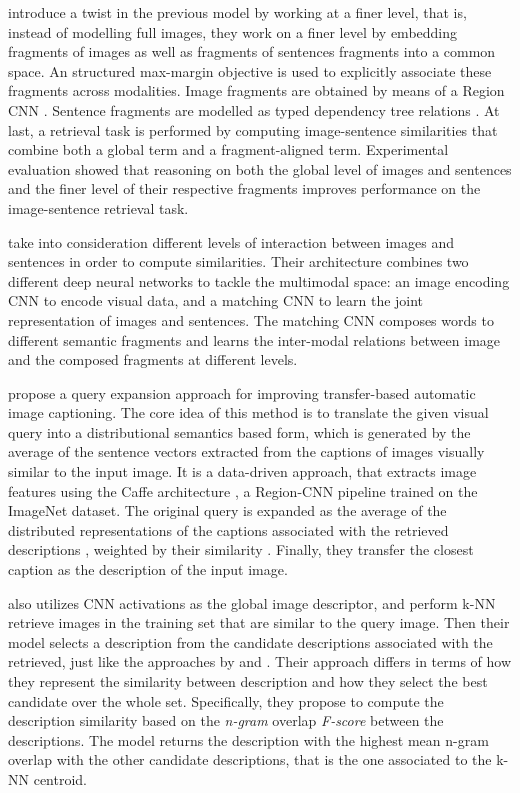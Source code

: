 \citet{Karpathy2014} introduce a twist in the previous model by working at a finer level, that is, instead of modelling full images, they work on a finer level by embedding fragments of images as well as fragments of sentences fragments into a common space.  An structured max-margin objective is used to explicitly associate these fragments across modalities. Image fragments are obtained by means of a Region CNN \citep{Girshick2014}. Sentence fragments are modelled as typed dependency tree relations \citep{DeMarneffe2006}. At last, a retrieval task is performed by computing image-sentence similarities that combine both a global term and a fragment-aligned term. Experimental evaluation showed that reasoning on both the global level of images and sentences and the finer level of their respective fragments improves performance on the image-sentence retrieval task.

\citet{Ma2015} take into consideration different levels of interaction between images and sentences in order to compute similarities. Their architecture combines two different deep neural networks to tackle the multimodal space: an image encoding CNN \citep{Simonyan2015} to encode visual data, and a matching CNN \citep{Hu2014} to learn the joint representation of images and sentences. The matching CNN composes words to different semantic fragments and learns the inter-modal relations between image and the composed fragments at different levels. 

\citet{Yagcioglu2015} propose a query expansion approach for improving transfer-based automatic image captioning. The core idea of this method is to translate the given visual query into a distributional semantics based form, which is generated by the average of the sentence vectors extracted from the captions of images visually similar to the input image. It is a data-driven approach, that extracts image features using the Caffe architecture \citep{Jia2014}, a Region-CNN pipeline trained on the ImageNet dataset. The original query is expanded as the average of the distributed representations of the captions associated with the retrieved descriptions \citep{Mikolov2013}, weighted by their similarity . Finally, they transfer the closest caption as the description of the input image.

\citet{Devlin2015} also utilizes CNN activations as the global image descriptor, and perform k-NN retrieve images in the training set that are similar to the query image. Then their model selects a description from the candidate descriptions associated with the retrieved, just like the approaches by \citet{Mason2015} and \citet{Yagcioglu2015}. Their approach differs in terms of how they represent the similarity between description and how they select the best candidate over the whole set. Specifically, they propose to compute the description similarity based on the \textit{n-gram} overlap \textit{F-score} between the descriptions. The model returns the description with the highest mean n-gram overlap with the other candidate descriptions, that is the one associated to the k-NN centroid.

